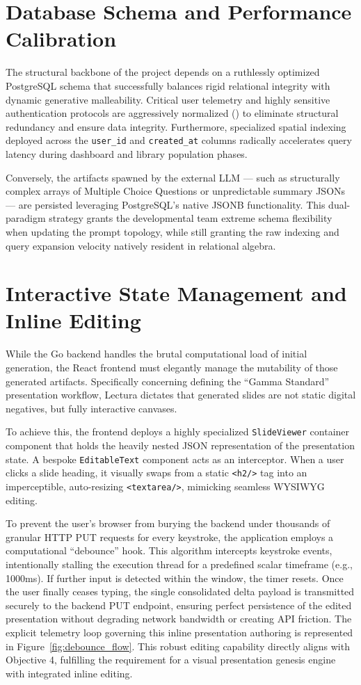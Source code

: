 \section{Database Schema and Performance Calibration}
The structural backbone of the project depends on a ruthlessly optimized PostgreSQL schema that successfully balances rigid relational integrity with dynamic generative malleability. Critical user telemetry and highly sensitive authentication protocols are aggressively normalized () to eliminate structural redundancy and ensure data integrity. Furthermore, specialized spatial indexing deployed across the \texttt{user\_id} and \texttt{created\_at} columns radically accelerates query latency during dashboard and library population phases.

Conversely, the artifacts spawned by the external LLM — such as structurally complex arrays of Multiple Choice Questions or unpredictable summary JSONs — are persisted leveraging PostgreSQL’s native JSONB functionality. This dual-paradigm strategy grants the developmental team extreme schema flexibility when updating the prompt topology, while still granting the raw indexing and query expansion velocity natively resident in relational algebra.

\section{Interactive State Management and Inline Editing}
While the Go backend handles the brutal computational load of initial generation, the React frontend must elegantly manage the mutability of those generated artifacts. Specifically concerning defining the ``Gamma Standard'' presentation workflow, Lectura dictates that generated slides are not static digital negatives, but fully interactive canvases.

To achieve this, the frontend deploys a highly specialized \texttt{SlideViewer} container component that holds the heavily nested JSON representation of the presentation state. A bespoke \texttt{EditableText} component acts as an interceptor. When a user clicks a slide heading, it visually swaps from a static \verb|<h2/>| tag into an imperceptible, auto-resizing \verb|<textarea/>|, mimicking seamless WYSIWYG editing.

To prevent the user’s browser from burying the backend under thousands of granular HTTP PUT requests for every keystroke, the application employs a computational ``debounce'' hook. This algorithm intercepts keystroke events, intentionally stalling the execution thread for a predefined scalar timeframe (e.g., 1000ms). If further input is detected within the window, the timer resets. Once the user finally ceases typing, the single consolidated delta payload is transmitted securely to the backend PUT endpoint, ensuring perfect persistence of the edited presentation without degrading network bandwidth or creating API friction. The explicit telemetry loop governing this inline presentation authoring is represented in Figure~\ref{fig:debounce_flow}. This robust editing capability directly aligns with Objective 4, fulfilling the requirement for a visual presentation genesis engine with integrated inline editing.

